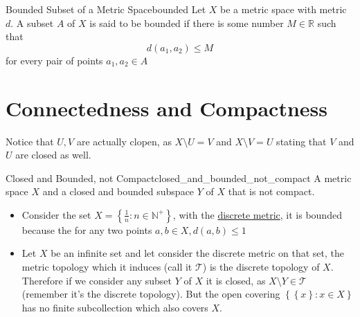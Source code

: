 





\begin{definition}{Bounded Subset of a Metric Space}{bounded}
Let $X$ be a metric space with metric $d$. A subset $A$ of $X$ is said to be bounded if there is some number $M \in  \mathbb{R}$ such that
\[
d\left(a_{1}, a_{2}\right) \leq M
\]
for every pair of points $ a_{ 1 } , a_{ 2 } \in  A $ 
\end{definition}






\section{Connectedness and Compactness}




Notice that $ U, V $ are actually clopen, as $ X \setminus  U =  V $ and $ X \setminus  V = U $ stating that $ V $ and $ U $ are closed as well.

\begin{example}{Closed and Bounded, not Compact}{closed_and_bounded_not_compact}
A metric space $X$  and a closed and bounded subspace $Y$ of  $X$  that is not compact.
\end{example}


\begin{itemize}
    \item Consider the set $ X =  \left\{ \frac{1}{n}: n \in  \mathbb{N} ^{ +  }  \right\}  $, with the \hyperref[example:discrete_metric]{discrete metric}, it is bounded because the for any two points $ a, b \in X, d\left( a, b \right)  \le 1 $  %
    \item Let $ X $ be an infinite set and let consider the discrete metric on that set,  the metric topology which it induces (call it $ \mathcal{ T }  $)  is the discrete topology of $ X $. Therefore if we consider any subset $ Y $ of $ X $ it is closed, as $ X \setminus Y \in  \mathcal{ T }  $ (remember it's the discrete topology). But the open covering $ \left\{ \left\{ x \right\} : x \in  X \right\}  $ has no finite subcollection which also covers $ X $.
\end{itemize}

